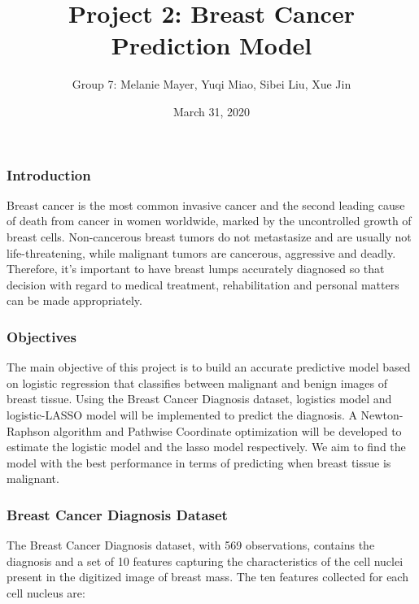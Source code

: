 \documentclass[]{article}
\title{Project 2: Breast Cancer Prediction Model}
\author{Group 7: Melanie Mayer, Yuqi Miao, Sibei Liu, Xue Jin}
\date{March 31, 2020}
\begin{document}
\maketitle

\hypertarget{introduction}{%
\subsubsection{Introduction}\label{introduction}}

Breast cancer is the most common invasive cancer and the second leading
cause of death from cancer in women worldwide, marked by the
uncontrolled growth of breast cells. Non-cancerous breast tumors do not
metastasize and are usually not life-threatening, while malignant tumors
are cancerous, aggressive and deadly. Therefore, it's important to have
breast lumps accurately diagnosed so that decision with regard to
medical treatment, rehabilitation and personal matters can be made
appropriately.

\hypertarget{objectives}{%
\subsubsection{Objectives}\label{objectives}}

The main objective of this project is to build an accurate predictive
model based on logistic regression that classifies between malignant and
benign images of breast tissue. Using the Breast Cancer Diagnosis
dataset, logistics model and logistic-LASSO model will be implemented to
predict the diagnosis. A Newton-Raphson algorithm and Pathwise
Coordinate optimization will be developed to estimate the logistic model
and the lasso model respectively. We aim to find the model with the best
performance in terms of predicting when breast tissue is malignant.

\hypertarget{breast-cancer-diagnosis-dataset}{%
\subsubsection{Breast Cancer Diagnosis
Dataset}\label{breast-cancer-diagnosis-dataset}}

The Breast Cancer Diagnosis dataset, with 569 observations, contains the
diagnosis and a set of 10 features capturing the characteristics of the
cell nuclei present in the digitized image of breast mass. The ten
features collected for each cell nucleus are:
\end{document}
